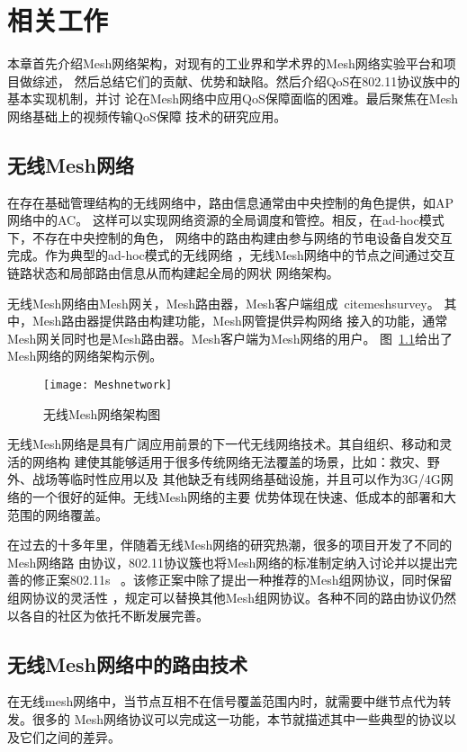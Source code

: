\chapter{相关工作}
\label{cha:related_work}
本章首先介绍Mesh网络架构，对现有的工业界和学术界的Mesh网络实验平台和项目做综述，
然后总结它们的贡献、优势和缺陷。然后介绍QoS在802.11协议族中的基本实现机制，并讨
论在Mesh网络中应用QoS保障面临的困难。最后聚焦在Mesh网络基础上的视频传输QoS保障
技术的研究应用。

\section{无线Mesh网络}
在存在基础管理结构的无线网络中，路由信息通常由中央控制的角色提供，如AP网络中的AC。
这样可以实现网络资源的全局调度和管控。相反，在ad-hoc模式下，不存在中央控制的角色，
网络中的路由构建由参与网络的节电设备自发交互完成。作为典型的ad-hoc模式的无线网络
，无线Mesh网络中的节点之间通过交互链路状态和局部路由信息从而构建起全局的网状
网络架构。

无线Mesh网络由Mesh网关，Mesh路由器，Mesh客户端组成~cite{meshsurvey}。
其中，Mesh路由器提供路由构建功能，Mesh网管提供异构网络
接入的功能，通常Mesh网关同时也是Mesh路由器。Mesh客户端为Mesh网络的用户。
图~\ref{fig:meshnetwork}给出了Mesh网络的网络架构示例。
\begin{figure}[H] %
  \centering
  \texttt{[image: Meshnetwork]}
  \caption{无线Mesh网络架构图}
  \label{fig:meshnetwork}
\end{figure}

无线Mesh网络是具有广阔应用前景的下一代无线网络技术。其自组织、移动和灵活的网络构
建使其能够适用于很多传统网络无法覆盖的场景，比如：救灾、野外、战场等临时性应用以及
其他缺乏有线网络基础设施，并且可以作为3G/4G网络的一个很好的延伸。无线Mesh网络的主要
优势体现在快速、低成本的部署和大范围的网络覆盖。

在过去的十多年里，伴随着无线Mesh网络的研究热潮，很多的项目开发了不同的Mesh网络路
由协议，802.11协议簇也将Mesh网络的标准制定纳入讨论并以提出完善的修正案802.11s
~\cite{IEEE80211s}。该修正案中除了提出一种推荐的Mesh组网协议，同时保留组网协议的灵活性
，规定可以替换其他Mesh组网协议。各种不同的路由协议仍然以各自的社区为依托不断发展完善。

\section{无线Mesh网络中的路由技术}
在无线mesh网络中，当节点互相不在信号覆盖范围内时，就需要中继节点代为转发。很多的
Mesh网络协议可以完成这一功能，本节就描述其中一些典型的协议以及它们之间的差异。

